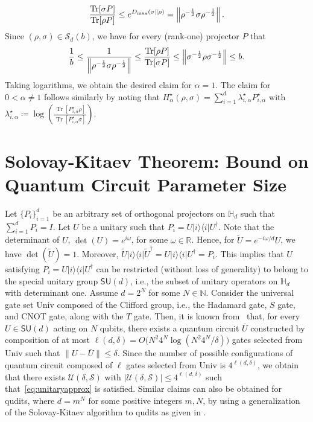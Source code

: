 \documentclass[a4paper,onecolumn,11pt,accepted=2026-05-12]{quantumarticle}
\newcommand{\bra}[1]{\langle#1|}
\newcommand{\ket}[1]{|#1\rangle}
\newcommand{\norm}[1]{\left\Vert#1\right\Vert}
\newcommand{\cS}{\mathcal{S}}
\newcommand{\cU}{\mathcal{U}}
\newcommand{\HH}{\mathbb{H}}
\newcommand{\NN}{\mathbb{N}}
\newcommand{\RR}{\mathbb{R}}
\begin{document}
\begin{align}
 \frac{\operatorname{Tr}[\sigma P]}{\operatorname{Tr}[\rho P]} \leq   e^{D_{\max}(\sigma\|\rho)}= \norm{\rho^{-\frac 12}\sigma \rho^{-\frac 12}}. \notag
\end{align}
Since $(\rho,\sigma) \in \cS_d(b)$, 
we have for every (rank-one) projector $P$ that     
\begin{align} 
\frac{1}{b}\leq \frac{1}{\norm{\rho^{-\frac{1}{2}} \sigma \rho^{-\frac{1}{2}}}} \leq  \frac{\operatorname{Tr}[\rho P]}{\operatorname{Tr}[\sigma P]} \leq \norm{\sigma^{-\frac{1}{2}}\rho \sigma^{-\frac{1}{2}}} \leq b. \notag 
\end{align}
Taking logarithms, we obtain the desired claim for $\alpha=1$. The claim for  $0< \alpha  \neq 1$ follows  similarly by noting that  $H_{\alpha}^{\star}(\rho,\sigma)= \sum_{i=1}^d \lambda_{i,\alpha}^{\star} P_{i,\alpha}^{\star}$ with $ \lambda_{i,\alpha}^{\star} \coloneqq\log  \!\left(\frac{\operatorname{Tr}[P_{i,\alpha}^{\star} \rho]}{\operatorname{Tr}[P_{i,\alpha}^{\star} \sigma]}\right)$. 


\section{Solovay-Kitaev Theorem: Bound on Quantum Circuit Parameter Size}
\label{Sec:eff-imp-unit}
Let $\{P_i\}_{i=1}^d$ be an arbitrary set of orthogonal projectors on $\HH_d$ such that 
$\sum_{i=1}^d P_i=I$. Let $U$ be a unitary such that $P_i=U\ket{i}\!\bra{i}U^{\dag}$. 
Note that the determinant of $U$,  $\det(U)=e^{i \omega}$, for some $\omega \in \RR$. Hence, for $\tilde U=e^{-i \omega/d} U$, we have $\det(\tilde U)=1$. Moreover, $\tilde U\ket{i}\!\bra{i}\tilde U^{\dag}= U\ket{i}\!\bra{i} U^{\dag}= P_i$.  This implies that $U$ satisfying $P_i=U\ket{i}\!\bra{i}U^{\dag}$ can be restricted (without loss of generality) to belong to the  special unitary group $\mathsf{SU}(d)$, i.e., the subset of unitary operators on $\HH_d$ with determinant one.
Assume $d=2^N$ for some $N \in \NN$. Consider the universal gate set  $\mathrm{Univ}$ composed of the Clifford group, i.e., the Hadamard gate, $S$ gate, and CNOT gate, along with the $T$ gate. 
Then, it is known from~\cite{Ross-Selinger-2016} that, for every $U \in \mathsf{SU}(d)$ acting on $N$ qubits,  there exists a quantum circuit $\bar U $ constructed by composition of at most $\ell(d,\delta)=O\big(N^2 4^N \log  (N^2 4^N /\delta)\big)$ gates selected from $\mathrm{Univ}$  such that $\big\|U-\bar  U\big\| \leq \delta$. 
Since the number of possible configurations of quantum circuit composed of $\ell$ gates selected from $\mathrm{Univ}$ is $4^{\ell(d,\delta)}$, we obtain that  there exists $\cU(\delta,\cS)$ with $|\cU(\delta,\cS)| \leq 4^{\ell(d,\delta)}$ such that~\eqref{eq:unitaryapprox} is satisfied. Similar claims can also be obtained for qudits, where $d=m^N$ for some positive integers $m,N$, by using a generalization of the Solovay-Kitaev algorithm to qudits as given in \cite{Dawson-Nielsen-2006}.  
\end{document}
